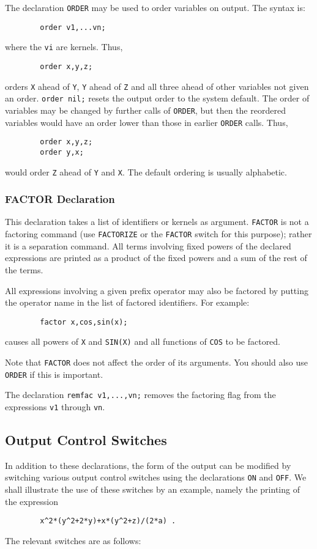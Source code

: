 The declaration {\tt ORDER} may be used to order variables
on output.  The syntax is:
\begin{verbatim}
        order v1,...vn;
\end{verbatim}
where the {\tt vi} are kernels.  Thus,
\begin{verbatim}
        order x,y,z;
\end{verbatim}
orders {\tt X} ahead of {\tt Y}, {\tt Y} ahead of {\tt Z} and all three
ahead of other variables not given an order. {\tt order nil;} resets the
output order to the system default.  The order of variables may be changed
by further calls of {\tt ORDER}, but then the reordered variables would
have an order lower than those in earlier {\tt ORDER} calls.
Thus,
\begin{verbatim}
        order x,y,z;
        order y,x;
\end{verbatim}
would order {\tt Z} ahead of {\tt Y} and {\tt X}.  The default ordering is
usually alphabetic.

\subsubsection{FACTOR Declaration}

This declaration takes a list of identifiers or kernels
as argument. {\tt FACTOR} is not a factoring command
(use {\tt FACTORIZE} or the {\tt FACTOR} switch for this purpose); rather it
is a separation command.  All terms involving fixed powers of the declared
expressions are printed as a product of the fixed powers and a sum of the
rest of the terms.

All expressions involving a given prefix operator may also be factored by
putting the operator name in the list of factored identifiers. For example:
\begin{verbatim}
        factor x,cos,sin(x);
\end{verbatim}
causes all powers of {\tt X} and {\tt SIN(X)} and all functions of
{\tt COS} to be factored.

Note that {\tt FACTOR} does not affect the order of its arguments.  You
should also use {\tt ORDER} if this is important.

The declaration {\tt remfac v1,...,vn;} removes the
factoring flag from the expressions {\tt v1} through {\tt vn}.

\subsection{Output Control Switches}
\label{sec-output}
In addition to these declarations, the form of the output can be modified
by switching various output control switches using the declarations
{\tt ON} and {\tt OFF}.  We shall illustrate the use of these switches by an
example, namely the printing of the expression
\begin{verbatim}
        x^2*(y^2+2*y)+x*(y^2+z)/(2*a) .
\end{verbatim}
The relevant switches are as follows:


